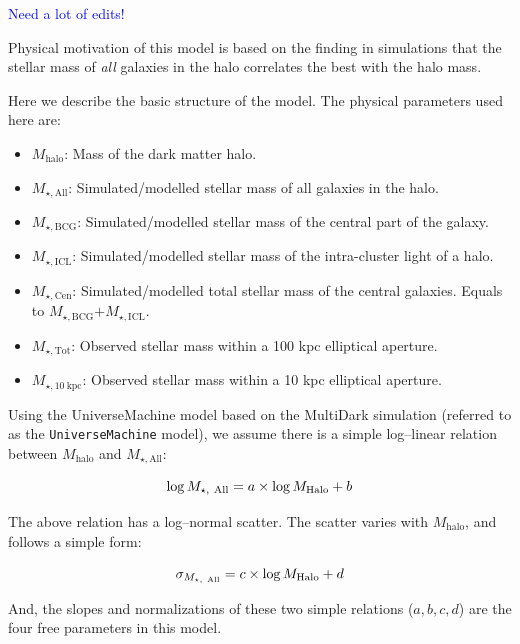 \documentclass[a4paper,fleqn,usenatbib]{mnras}
\def\mhalo{{$M_{\mathrm{halo}}$}}
\def\mtot{{$M_{\star,\mathrm{Tot}}$}}
\def\minn{{$M_{\star,10\ \mathrm{kpc}}$}}
\def\mall{{$M_{\star,\mathrm{All}}$}}
\def\mbcg{{$M_{\star,\mathrm{BCG}}$}}
\def\micl{{$M_{\star,\mathrm{ICL}}$}}
\def\mcen{{$M_{\star,\mathrm{Cen}}$}}
\def\um{\texttt{UniverseMachine}}
\newcommand{\plan}[1]{\textcolor{blue}{#1}}
\begin{document}
    \plan{Need a lot of edits!}

    Physical motivation of this model is based on the finding in simulations that the 
    stellar mass of \emph{all} galaxies in the halo correlates the best with the 
    halo mass. 

    Here we describe the basic structure of the model. 
    The physical parameters used here are: 

    \begin{itemize}
    
        \item \mhalo{}: Mass of the dark matter halo. 
        \item \mall{}: Simulated/modelled stellar mass of all galaxies in the halo.
        \item \mbcg{}: Simulated/modelled stellar mass of the central part of the 
            galaxy.
        \item \micl{}: Simulated/modelled stellar mass of the intra-cluster light of 
            a halo. 
        \item \mcen{}: Simulated/modelled total stellar mass of the central galaxies. 
            Equals to \mbcg{}$+$\micl{}.
        \item \mtot{}: Observed stellar mass within a 100 kpc elliptical aperture. 
        \item \minn{}: Observed stellar mass within a 10 kpc elliptical aperture. 

    \end{itemize}
    
    Using the UniverseMachine model based on the MultiDark simulation (referred to 
    as the \um{} model), we assume there is a simple log--linear relation between 
    \mhalo{} and \mall{}: 

    \begin{equation}
        \log M_{\star,\ \mathrm{All}} = a \times \log M_{\rm Halo} + b 
    \end{equation}

    The above relation has a log--normal scatter.  
    The scatter varies with \mhalo{}, and follows a simple form: 

    \begin{equation}
        \sigma_{M_{\star,\ \mathrm{All}}} = c \times \log M_{\rm Halo} + d 
    \end{equation}

    And, the slopes and normalizations of these two simple relations ($a, b, c, d$) 
    are the four free parameters in this model.
\end{document}
